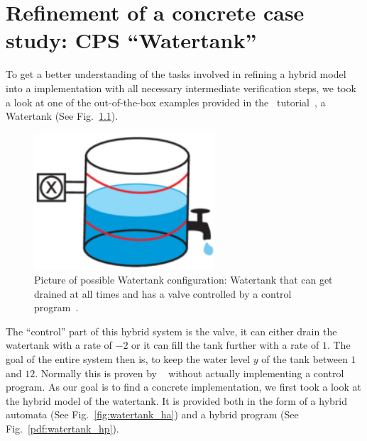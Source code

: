 



\chapter{Refinement of a concrete case study: CPS ``Watertank''}
\label{ch:Watertank}

To get a better understanding of the tasks involved in refining a hybrid model into a implementation with all necessary intermediate verification steps, we took a look at one of the out-of-the-box examples provided in the \keym~tutorial~\cite{keYmaera}, a Watertank (See Fig.~\ref{fig:watertank}).

\begin{figure}
	\setcounter{figure}{0}
	\centering
	\includegraphics[width=0.6\textwidth]{images/watertank}
	\caption{Picture of possible Watertank configuration: Watertank that can get drained at all times and has a valve controlled by a control program~\cite{keymaeraGuide}.}
	\label{fig:watertank}
\end{figure}

The ``control'' part of this hybrid system is the valve, it can either drain the watertank with a rate of \(-2\) or it can fill the tank further with a rate of \(1\). The goal of the entire system then is, to keep the water level \(y\) of the tank between \(1\) and \(12\). Normally this is proven by \keym~ without actually implementing a control program. As our goal is to find a concrete implementation,  we first took a look at the hybrid model of the watertank. It is provided both in the form of a hybrid automata (See Fig.~\ref{fig:watertank_ha}) and a hybrid program (See Fig.~\ref{pdf:watertank_hp}).


